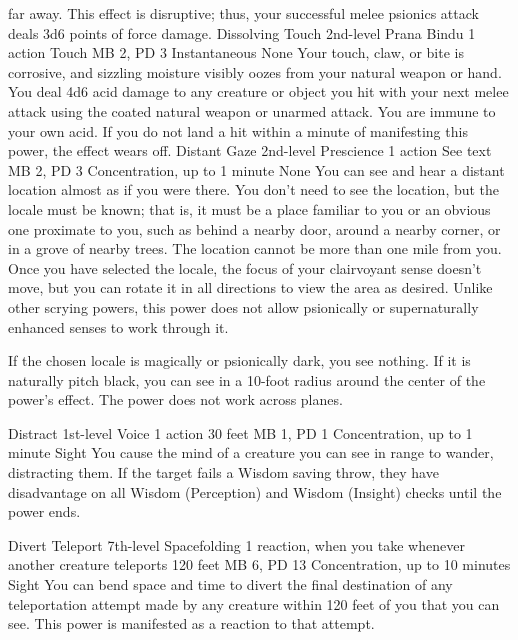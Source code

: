 far away. This effect is disruptive; thus, your successful
melee psionics attack deals 3d6 points of force damage.
\DndPowerHeader%
    {Dissolving Touch\label{pwr:dissolving_touch}}
    {2nd-level Prana Bindu}
    {1 action}
    {Touch}
    {MB 2, PD 3}
    {Instantaneous}
    {None}
Your touch, claw, or bite is corrosive, and
sizzling moisture visibly oozes from your natural weapon or
hand. You deal 4d6 acid damage to any creature or object you
hit with your next melee attack using the coated natural weapon
or unarmed attack. You are immune to your own acid. If you
do not land a hit within a minute of manifesting this power,
the effect wears off.
\DndPowerHeader%
    {Distant Gaze\label{pwr:distant_gaze}}
    {2nd-level Prescience}
    {1 action}
    {See text}
    {MB 2, PD 3}
    {Concentration, up to 1 minute}
    {None}
You can see and hear a distant location almost
as if you were there. You don't need to see the location,
but the locale must be known; that is, it must be a place
familiar to you or an obvious one proximate to you, such as
behind a nearby door, around a nearby corner, or in a grove
of nearby trees.
The location cannot be more than one mile from you.
Once you have selected the locale, the focus
of your clairvoyant sense doesn't move, but you can rotate
it in all directions to view the area as desired. Unlike other
scrying powers, this power does not allow psionically
or supernaturally enhanced senses to work through it.

If the chosen locale is magically or psionically dark, you
see nothing. If it is naturally pitch black, you can see in
a 10-foot radius around the center of the power's effect.
The power does not work across planes.

\DndPowerHeader%
    {Distract\label{pwr:distract}}
    {1st-level Voice}
    {1 action}
    {30 feet}
    {MB 1, PD 1}
    {Concentration, up to 1 minute}
    {Sight}
You cause the mind of a creature
you can see in range to wander, distracting them. If the target
fails a Wisdom saving throw, they have disadvantage on all
Wisdom (Perception) and Wisdom (Insight) checks until the
power ends.

\DndPowerHeader%
    {Divert Teleport\label{pwr:divert_teleport}}
    {7th-level Spacefolding}
    {1 reaction, when you take whenever another creature teleports}
    {120 feet}
    {MB 6, PD 13}
    {Concentration, up to 10 minutes}
    {Sight}
You can bend space and time to divert the
final destination of any teleportation attempt made by any
creature within 120 feet of you that you can see.
This power is manifested as a reaction to that attempt.

